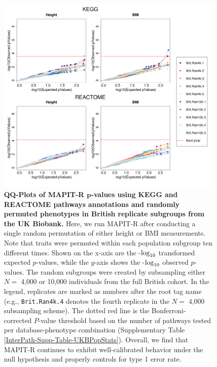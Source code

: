 \documentclass[10pt]{article}
\def\log{{\rm log}}
\begin{document}
\begin{figure}[htbp]
\centering
\includegraphics[width=\textwidth]{Images/Supp/InterPath_Supp_Figure_BritReps_perm1_QQPlots_AllPaths_vs1.png}
\caption{\textbf{QQ-Plots of MAPIT-R $\bm{p}$-values using KEGG and REACTOME pathways annotations and randomly permuted phenotypes in British replicate subgroups from the UK Biobank.} Here, we run MAPIT-R after conducting a single random permutation of either height or BMI measurements. Note that traits were permuted within each population subgroup ten different times. Shown on the x-axis are the -$\log_{10}$ transformed expected $p$-values, while the $y$-axis shows the -$\log_{10}$ observed $p$-values. The random subgroups were created by subsampling either $N =$ 4,000 or 10,000 individuals from the full British cohort. In the legend, replicates are marked as numbers after the root tag name (e.g., \texttt{Brit.Ran4k.4} denotes the fourth replicate in the $N =$ 4,000 subsampling scheme). The dotted red line is the Bonferroni-corrected $P$-value threshold based on the number of pathways tested per database-phenotype combination (Supplementary Table \ref{InterPath-Supp-Table-UKBPopStats}). Overall, we find that MAPIT-R continues to exhibit well-calibrated behavior under the null hypothesis and properly controls for type 1 error rate.}
\label{InterPath-Supp-Figure-BritReps-perm1-QQPlots-AllPaths}
\end{figure}
\clearpage
\end{document}
